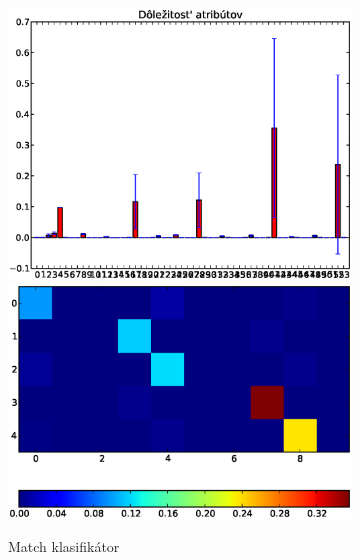 \begin{figure}[htp]
        \centering
        \begin{subfigure}[t]{0.4\textwidth}
                \includegraphics[width=\textwidth]{images/clf_fi/randomforest_fullcmp_5_bars}
                \includegraphics[width=\textwidth]{images/clf_fi/randomforest_fullcmp_5_heatmap}
                \caption{Match klasifikátor}
                \label{fig:datatype3-m}
        \end{subfigure}%
        \qquad\qquad %
        \begin{subfigure}[t]{0.4\textwidth}

\end{subfigure}
\end{figure}
